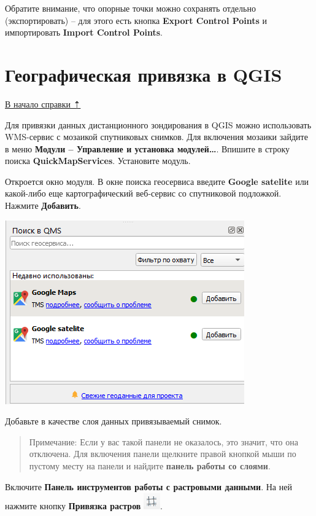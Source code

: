 \documentclass[
  12pt,
]{book}
\begin{document}
Обратите внимание, что опорные точки можно сохранять отдельно (экспортировать) -- для этого есть кнопка \textbf{Export Control Points} и импортировать \textbf{Import Control Points}.

\hypertarget{georeference-qgis}{%
\section{Географическая привязка в QGIS}\label{georeference-qgis}}

\protect\hyperlink{georeference}{В начало справки ⇡}

Для привязки данных дистанционного зондирования в QGIS можно использовать WMS-сервис с мозаикой спутниковых снимков. Для включения мозаики зайдите в меню \textbf{Модули -- Управление и установка модулей\ldots{}}. Впишите в строку поиска \textbf{QuickMapServices}. Установите модуль.

Откроется окно модуля. В окне поиска геосервиса введите \textbf{Google satelite} или какой-либо еще картографический веб-сервис со спутниковой подложкой. Нажмите \textbf{Добавить}.

\includegraphics{images/Ref02/QMS.png}

Добавьте в качестве слоя данных привязываемый снимок.

\begin{quote}
Примечание: Если у вас такой панели не оказалось, это значит, что она отключена. Для включения панели щелкните правой кнопкой мыши по пустому месту на панели и найдите \textbf{панель работы со слоями}.
\end{quote}

Включите \textbf{Панель инструментов работы с растровыми данными}. На ней нажмите кнопку \textbf{Привязка растров} \includegraphics{images/Ref02/Reference_button.png}.
\end{document}
